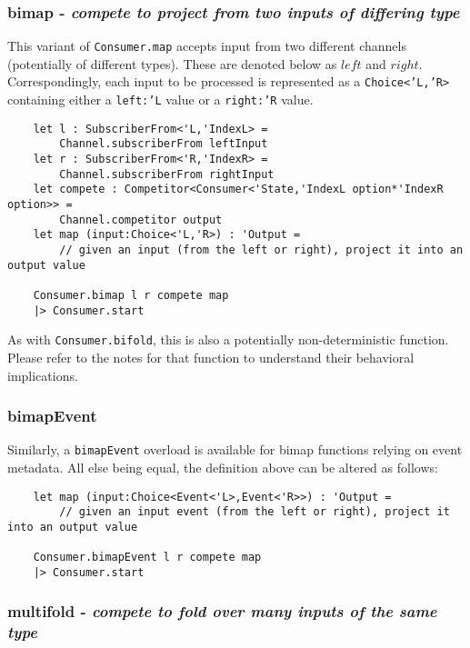 \documentclass{article}
\begin{document}
\subsubsection{bimap - \textit{compete to project from two inputs of differing type}}

This variant of \texttt{Consumer.map} accepts input from two different channels (potentially of different types).  These are denoted below as $left$ and $right$.  Correspondingly, each input to be processed is represented as a \texttt{Choice<'L,'R>} containing either a \texttt{left:'L} value or a \texttt{right:'R} value.

\begin{verbatim}
    let l : SubscriberFrom<'L,'IndexL> =
        Channel.subscriberFrom leftInput
    let r : SubscriberFrom<'R,'IndexR> =
        Channel.subscriberFrom rightInput
    let compete : Competitor<Consumer<'State,'IndexL option*'IndexR option>> =
        Channel.competitor output
    let map (input:Choice<'L,'R>) : 'Output =
        // given an input (from the left or right), project it into an output value

    Consumer.bimap l r compete map
    |> Consumer.start
\end{verbatim}

As with \texttt{Consumer.bifold}, this is also a potentially non-deterministic function.  Please refer to the notes for that function to understand their behavioral implications.

\subsubsection{bimapEvent}

Similarly, a \texttt{bimapEvent} overload is available for bimap functions relying on event metadata.  All else being equal, the definition above can be altered as follows:

\begin{verbatim}
    let map (input:Choice<Event<'L>,Event<'R>>) : 'Output =
        // given an input event (from the left or right), project it into an output value

    Consumer.bimapEvent l r compete map
    |> Consumer.start
\end{verbatim}

\subsubsection{multifold - \textit{compete to fold over many inputs of the same type}}
\end{document}
